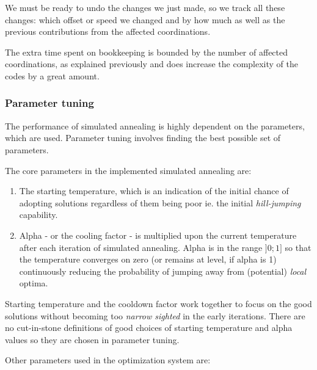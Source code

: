 We must be ready to undo the changes we just made, so we track all these changes: which offset or speed we changed and by how much as well as the previous contributions from the affected coordinations.

The extra time spent on bookkeeping is bounded by the number of affected coordinations, as explained previously and does increase the complexity of the codes by a great amount.

\subsubsection{Parameter tuning}
The performance of simulated annealing is highly dependent on the parameters, which are used. Parameter tuning involves finding the best possible set of parameters. 

The core parameters in the implemented simulated annealing are:
\begin{enumerate}
\item The starting temperature, which is an indication of the initial chance of adopting solutions regardless of them being poor ie. the initial \textit{hill-jumping} capability.
\item Alpha - or the cooling factor - is multiplied upon the current temperature after each iteration of simulated annealing. Alpha is in the range $]0;1]$ so that the temperature converges on zero (or remains at level, if alpha is 1) continuously reducing the probability of jumping away from (potential) \textit{local} optima.
\end{enumerate}

Starting temperature and the cooldown factor work together to focus on the good solutions without becoming too \textit{narrow sighted} in the early iterations. There are no cut-in-stone definitions of good choices of starting temperature and alpha values so they are chosen in parameter tuning.

Other parameters used in the optimization system are:

